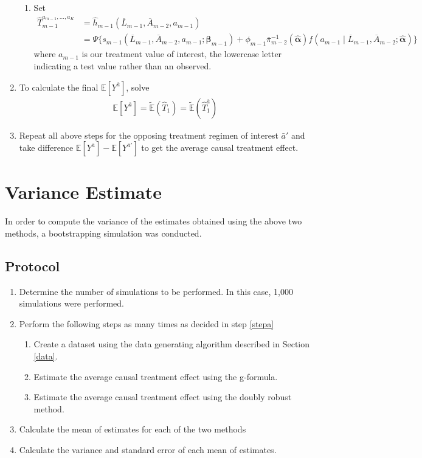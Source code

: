 \begin{enumerate}
\begin{enumerate}
\item Set 
\begin{align} 
\hat{T}_{m-1}^{a_{m-1}, \dots, a_K} &= \hat{h}_{m-1}(\overline{L}_{m-1}, \overline{A}_{m-2}, a_{m-1}) \\
&=  \Psi \{s_{m-1}(\overline{L}_{m-1}, \overline{A}_{m-2}, a_{m-1}; \mathbf{\beta}_{m-1}) + \phi_{m-1} \overline{\pi}_{m-2}^{-1} (\hat{\mathbf{\alpha}}) f(a_{m-1} \mid \overline{L}_{m-1}, \overline{A}_{m-2}; \hat{\mathbf{\alpha}}) \}
\end{align} 
where $a_{m-1}$ is our treatment value of interest, the lowercase letter indicating a test value rather than an observed.  
\end{enumerate}

\item To calculate the final $\mathbb{E}[Y^{\bar{a}}]$, solve 
\begin{align} 
\mathbb{E}[Y^{\bar{a}}] = \tilde{\mathbb{E}}(\hat{T}_1) = \tilde{\mathbb{E}}(\hat{T}_1^{\bar{a}})
\end{align}

\item Repeat all above steps for the opposing treatment regimen of interest $\bar{a}'$ and take difference $\mathbb{E}[Y^{\bar{a}}] - \mathbb{E}[Y^{\bar{a}'}]$ to get the average causal treatment effect.  
\end{enumerate}


\section{Variance Estimate} 
In order to compute the variance of the estimates obtained using the above two methods, a bootstrapping simulation was conducted.  

\subsection{Protocol}
\begin{enumerate} 
\item Determine the number of simulations to be performed.  In this case, 1,000 simulations were performed.  \label{stepa} 
\item Perform the following steps as many times as decided in step \ref{stepa} 
\begin{enumerate}
\item Create a dataset using the data generating algorithm described in Section \ref{data}.  
\item Estimate the average causal treatment effect using the g-formula.  
\item Estimate the average causal treatment effect using the doubly robust method.  
\end{enumerate} 
\item Calculate the mean of estimates for each of the two methods 
\item Calculate the variance and standard error of each mean of estimates.  
\end{enumerate} 

